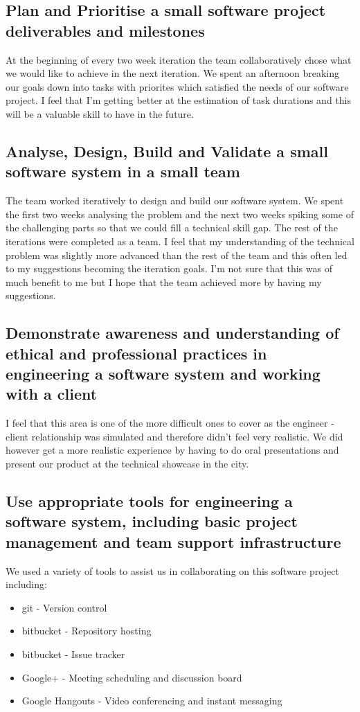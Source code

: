 \documentclass{article}
\begin{document}
\subsection{Plan and Prioritise a small software project deliverables and milestones}
At the beginning of every two week iteration the team collaboratively chose what we would like to achieve in the next iteration. We spent an afternoon breaking our goals down into tasks with priorites which satisfied the needs of our software project. I feel that I'm getting better at the estimation of task durations and this will be a valuable skill to have in the future.

\subsection{Analyse, Design, Build and Validate a small software system in a small team}
The team worked iteratively to design and build our software system. We spent the first two weeks analysing the problem and the next two weeks spiking some of the challenging parts so that we could fill a technical skill gap. The rest of the iterations were completed as a team. I feel that my understanding of the technical problem was slightly more advanced than the rest of the team and this often led to my suggestions becoming the iteration goals. I'm not sure that this was of much benefit to me but I hope that the team achieved more by having my suggestions.

\subsection{Demonstrate awareness and understanding of ethical and professional practices in engineering a software system and working with a client}
I feel that this area is one of the more difficult ones to cover as the engineer - client relationship was simulated and therefore didn't feel very realistic. We did however get a more realistic experience by having to do oral presentations and present our product at the technical showcase in the city.

\subsection{Use appropriate tools for engineering a software system, including basic project management and team support infrastructure}
We used a variety of tools to assist us in collaborating on this software project including:
\begin{itemize}
	\item{git - Version control}
	\item{bitbucket - Repository hosting}
	\item{bitbucket - Issue tracker}
	\item{Google+ - Meeting scheduling and discussion board}
	\item{Google Hangouts - Video conferencing and instant messaging}
\end{itemize}
\end{document}

